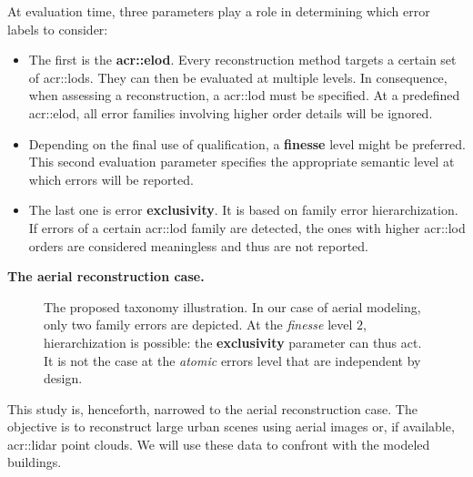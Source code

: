 \documentclass[runningheads]{llncs}
\begin{document}
At evaluation time, three parameters play a role in determining which error labels to consider:
\begin{itemize}
    \item The first is the \textbf{\acrfull{acr::elod}}. Every reconstruction method targets a certain set of \glspl{acr::lod}. They can then be evaluated at multiple levels. In consequence, when assessing a reconstruction, a \acrshort{acr::lod} must be specified. At a predefined \acrshort{acr::elod}, all error families involving higher order details will be ignored.
    \item Depending on the final use of qualification, a \textbf{finesse} level might be preferred. This second evaluation parameter specifies the appropriate semantic level at which errors will be reported.
    \item The last one is error \textbf{exclusivity}. It is based on family error hierarchization. If errors of a certain \acrshort{acr::lod} family are detected, the ones with higher \acrshort{acr::lod} orders are considered meaningless and thus are not reported.
\end{itemize}

\noindent
\textbf{The aerial reconstruction case.}
  \begin{figure}
        \begin{center}
            
            \caption{\label{fig::taxonomy} The proposed taxonomy illustration. In our case of aerial modeling, only two family errors are depicted. At the \textit{finesse} level $2$, hierarchization is possible: the \textbf{exclusivity} parameter can thus act. It is not the case at the \textit{atomic} errors level that are independent by design. }
        \end{center}
    \end{figure}
This study is, henceforth, narrowed to the aerial reconstruction case. The objective is to reconstruct large urban scenes using aerial images or, if available, \acrshort{acr::lidar} point clouds. We will use these data  to confront with the modeled buildings.
\end{document}
